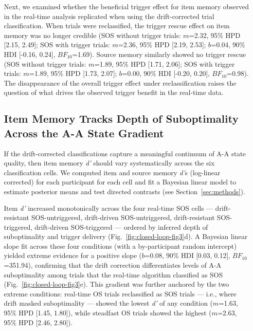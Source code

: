 Next, we examined whether the beneficial trigger effect for item memory observed in the real-time analysis replicated when using the drift-corrected trial classification. When trials were reclassified, the trigger rescue effect on item memory was no longer credible (SOS without trigger trials: $m$=2.32, 95\% HPD [2.15, 2.49]; SOS with trigger trials: $m$=2.36, 95\% HPD [2.19, 2.53]; $b$=0.04, 90\% HDI [-0.16, 0.24], $BF_{10}$=1.69). Source memory similarly showed no trigger rescue (SOS without trigger trials: $m$=1.89, 95\% HPD [1.71, 2.06]; SOS with trigger trials: $m$=1.89, 95\% HPD [1.73, 2.07]; $b$=0.00, 90\% HDI [-0.20, 0.20], $BF_{10}$=0.98). The disappearance of the overall trigger effect under reclassification raises the question of what drives the observed trigger benefit in the real-time data.

\subsection{Item Memory Tracks Depth of Suboptimality Across the A-A State Gradient}

If the drift-corrected classifications capture a meaningful continuum of A-A state quality, then item memory \textit{d'} should vary systematically across the six classification cells. We computed item and source memory \textit{d'}s (log-linear corrected) for each participant for each cell and fit a Bayesian linear model to estimate posterior means and test directed contrasts (see Section~\ref{sec:methods}).

Item \textit{d'} increased monotonically across the four real-time SOS cells –– drift-resistant SOS-untriggered, drift-driven SOS-untriggered, drift-resistant SOS-triggered, drift-driven SOS-triggered –– ordered by inferred depth of suboptimality and trigger delivery (Fig.~\ref{fig:closed-loop-fig3}d). A Bayesian linear slope fit across these four conditions (with a by-participant random intercept) yielded extreme evidence for a positive slope ($b$=0.08, 90\% HDI [0.03, 0.12], $BF_{10}$=351.94), confirming that the drift correction differentiates levels of A-A suboptimality among trials that the real-time algorithm classified as SOS (Fig.~\ref{fig:closed-loop-fig3}e). This gradient was further anchored by the two extreme conditions: real-time OS trials reclassified as SOS trials — i.e., where drift masked suboptimality — showed the lowest \textit{d'} of any condition ($m$=1.63, 95\% HPD [1.45, 1.80]), while steadfast OS trials showed the highest ($m$=2.63, 95\% HPD [2.46, 2.80]).

